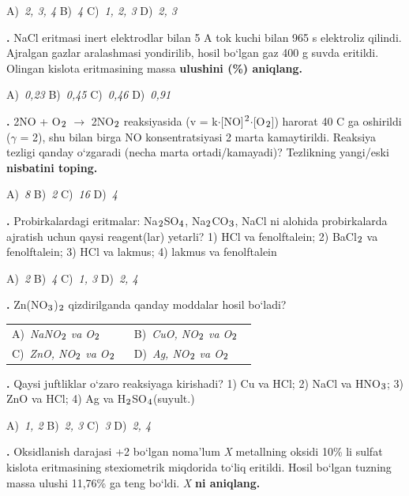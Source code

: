 \documentclass[11pt,a4paper]{article}
\renewcommand{\textsubscript}[1]{\ensuremath{_{\text{\fontsize{8}{8}\selectfont #1}}}}
\renewcommand{\textsuperscript}[1]{\ensuremath{^{\text{\fontsize{8}{8}\selectfont #1}}}}
\newcommand{\qn}[1]{\textbf{\fontsize{11.5}{13}\selectfont #1}}
\newcommand{\qsep}{\par\vspace{13pt}}
\begin{document}
\begin{multicols}{2}
\noindent A)~\textsl{2, 3, 4} \hfill B)~\textsl{4} \hfill C)~\textsl{1, 2, 3} \hfill D)~\textsl{2, 3}\par
\qsep
\noindent\qn{12.} NaCl eritmasi inert elektrodlar bilan 5 A tok kuchi bilan 965 s elektroliz qilindi. Ajralgan gazlar aralashmasi yondirilib, hosil bo`lgan gaz 400 g suvda eritildi. Olingan kislota eritmasining massa \textbf{ulushini (\%) aniqlang.}

\noindent A)~\textsl{0,23} \hfill B)~\textsl{0,45} \hfill C)~\textsl{0,46} \hfill D)~\textsl{0,91}\par
\qsep
\noindent\qn{13.} 2NO + O\textsubscript{2} $\to$ 2NO\textsubscript{2} reaksiyasida (v = k$\cdot$[NO]\textsuperscript{2}$\cdot$[O\textsubscript{2}]) harorat 40 \textdegree{}C ga oshirildi ($\gamma$ = 2), shu bilan birga NO konsentratsiyasi 2 marta kamaytirildi. Reaksiya tezligi qanday o`zgaradi (necha marta ortadi/kamayadi)? Tezlikning yangi/eski \textbf{nisbatini toping.}

\noindent A)~\textsl{8} \hfill B)~\textsl{2} \hfill C)~\textsl{16} \hfill D)~\textsl{4}\par
\qsep
\noindent\qn{14.} Probirkalardagi eritmalar: Na\textsubscript{2}SO\textsubscript{4}, Na\textsubscript{2}CO\textsubscript{3}, NaCl ni alohida probirkalarda ajratish uchun qaysi reagent(lar) yetarli? 1) HCl va fenolftalein; 2) BaCl\textsubscript{2} va fenolftalein; 3) HCl va lakmus; 4) lakmus va fenolftalein

\noindent A)~\textsl{2} \hfill B)~\textsl{4} \hfill C)~\textsl{1, 3} \hfill D)~\textsl{2, 4}\par
\qsep
\noindent\qn{15.} Zn(NO\textsubscript{3})\textsubscript{2} qizdirilganda qanday moddalar hosil bo`ladi?

\noindent\begin{tabular}{@{}p{0.47\linewidth}@{}p{0.47\linewidth}@{}}
A)~\textsl{NaNO\textsubscript{2} va O\textsubscript{2}} & B)~\textsl{CuO, NO\textsubscript{2} va O\textsubscript{2}} \\
C)~\textsl{ZnO, NO\textsubscript{2} va O\textsubscript{2}} & D)~\textsl{Ag, NO\textsubscript{2} va O\textsubscript{2}} \\
\end{tabular}\par
\qsep
\noindent\qn{16.} Qaysi juftliklar o`zaro reaksiyaga kirishadi? 1) Cu va HCl; 2) NaCl va HNO\textsubscript{3}; 3) ZnO va HCl; 4) Ag va H\textsubscript{2}SO\textsubscript{4}(suyult.)

\noindent A)~\textsl{1, 2} \hfill B)~\textsl{2, 3} \hfill C)~\textsl{3} \hfill D)~\textsl{2, 4}\par
\qsep
\noindent\qn{17.} Oksidlanish darajasi +2 bo`lgan noma'lum \textit{X} metallning oksidi 10\% li sulfat kislota eritmasining stexiometrik miqdorida to`liq eritildi. Hosil bo`lgan tuzning massa ulushi 11,76\% ga teng bo`ldi. \textit{X} \textbf{ni aniqlang.}


\end{multicols}
\end{document}
